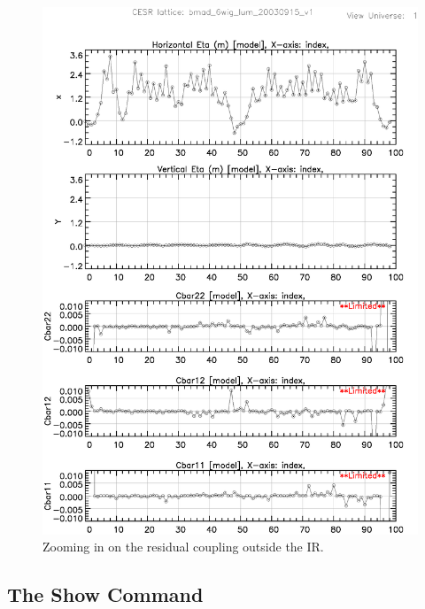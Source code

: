 \begin{figure}
  \centering
  \includegraphics[width=5in]{plot-coupling-no-IR.eps}
  \caption{Zooming in on the residual coupling outside the IR.}
  \label{f:plot.coupling.no.IR}
\end{figure}

\subsection{The Show Command}

